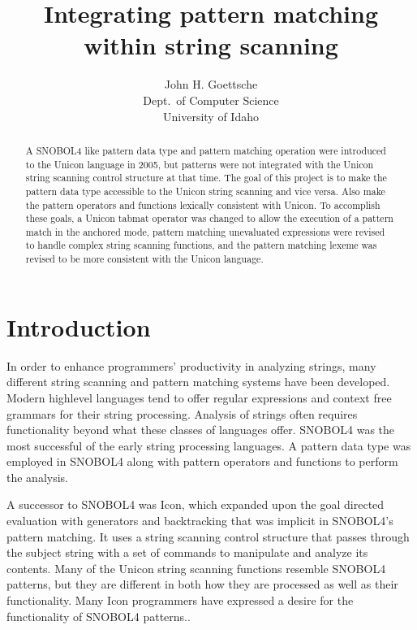 \documentclass{article}
\begin{document}
\linespread{1}
\title{Integrating pattern matching\\
within string scanning}
\author{John H. Goettsche\\
  Dept.\ of Computer Science\\
  University of Idaho}

\maketitle

\begin{abstract}
A SNOBOL4 like pattern data type and pattern matching operation were introduced to the Unicon language in 2005, but patterns were not integrated with the Unicon string scanning control structure at that time.  The goal of this project is to make the pattern data type accessible to the Unicon string scanning and vice versa.  Also make the pattern operators and functions lexically consistent with Unicon.  To accomplish these goals, a Unicon tabmat operator was changed to allow the execution of a pattern match in the anchored mode, pattern matching unevaluated expressions were revised to handle complex string scanning functions, and the pattern matching lexeme was revised to be more consistent with the Unicon language.

\end{abstract}

\pagebreak
\linespread{1}
\tableofcontents

\pagebreak
\section{Introduction}
In order to enhance programmers' productivity in analyzing strings, many different string scanning and pattern matching systems have been developed.  Modern highlevel languages tend to offer regular expressions and context free grammars for their string processing.  Analysis of strings often requires functionality beyond what these classes of languages offer.  SNOBOL4 was the most successful of the early string processing languages. \cite{Snobol, Gaikaiwari2005}  A pattern data type was employed in SNOBOL4 along with pattern operators and functions to perform the analysis.

A successor to SNOBOL4 was Icon, which expanded upon the goal directed evaluation with generators and backtracking that was implicit in SNOBOL4's pattern matching.\cite{GriswoldIcon, Gaikaiwari2005}  It uses a string scanning control structure that passes through the subject string with a set of commands to manipulate and analyze its contents.  Many of the Unicon string scanning functions resemble SNOBOL4 patterns, but they are different in both how they are processed as well as their functionality.  Many Icon programmers have expressed a desire for the functionality of SNOBOL4 patterns.\cite{Griswold1980}.
\end{document}
